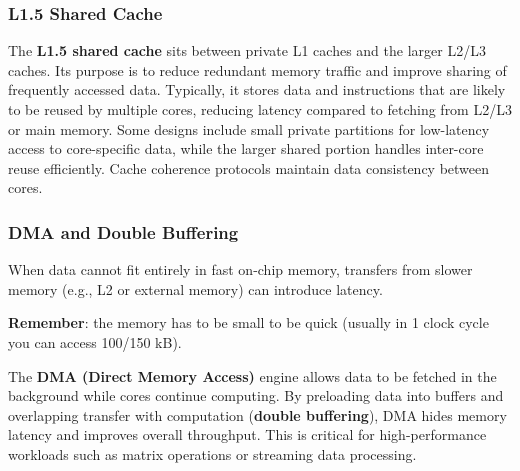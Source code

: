 \subsubsection{L1.5 Shared Cache}
The \textbf{L1.5 shared cache} sits between private L1 caches and the larger L2/L3 caches. Its purpose is to reduce redundant memory traffic and improve sharing of frequently accessed data. Typically, it stores data and instructions that are likely to be reused by multiple cores, reducing latency compared to fetching from L2/L3 or main memory. Some designs include small private partitions for low-latency access to core-specific data, while the larger shared portion handles inter-core reuse efficiently. Cache coherence protocols maintain data consistency between cores.  

\subsubsection{DMA and Double Buffering}
When data cannot fit entirely in fast on-chip memory, transfers from slower memory (e.g., L2 or external memory) can introduce latency. 
\begin{mybox}
    \textbf{Remember}: the memory has to be small to be quick (usually in 1 clock cycle you can access 100/150 kB).
\end{mybox}
The \textbf{DMA (Direct Memory Access)} engine allows data to be fetched in the background while cores continue computing. By preloading data into buffers and overlapping transfer with computation (\textbf{double buffering}), DMA hides memory latency and improves overall throughput. This is critical for high-performance workloads such as matrix operations or streaming data processing.
